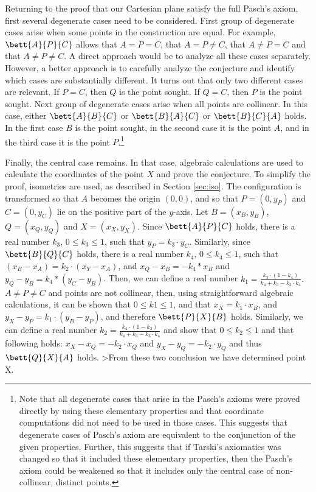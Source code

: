 











Returning to the proof that our Cartesian plane satisfy the full
Pasch's axiom, first several degenerate cases need to be
considered. First group of degenerate cases arise when some points in
the construction are equal. For example, $\bett{A}{P}{C}$ allows that
$A=P=C$, that $A=P\neq C$, that $A\neq P=C$ and that $A \neq P \neq
C$. A direct approach would be to analyze all these cases
separately. However, a better approach is to carefully analyze the
conjecture and identify which cases are substantially different. It
turns out that only two different cases are relevant. If $P=C$, then
$Q$ is the point sought. If $Q=C$, then $P$ is the point sought. Next
group of degenerate cases arise when all points are collinear. In this
case, either $\bett{A}{B}{C}$ or $\bett{B}{A}{C}$ or $\bett{B}{C}{A}$
holds. In the first case $B$ is the point sought, in the second case
it is the point $A$, and in the third case it is the point
$P$.\footnote{ Note that all degenerate cases that arise in the
  Pasch's axioms were proved directly by using these elementary
  properties and that coordinate computations did not need to be used
  in those cases. This suggests that degenerate cases of Pasch's axiom
  are equivalent to the conjunction of the given properties. Further,
  this suggests that if Tarski's axiomatics was changed so that it
  included these elementary properties, then the Pasch's axiom could
  be weakened so that it includes only the central case of
  non-collinear, distinct points.}

Finally, the central case remains. In that case, algebraic
calculations are used to calculate the coordinates of the point $X$
and prove the conjecture. To simplify the proof, isometries are used,
as described in Section \ref{sec:iso}. The configuration is
transformed so that $A$ becomes the origin $(0, 0)$, and so that $P =
(0, y_P)$ and $C = (0, y_C)$ lie on the positive part of the $y$-axis.
Let $B=(x_B, y_B)$, $Q=(x_Q, y_Q)$ and $X = (x_X, y_X)$. Since
$\bett{A}{P}{C}$ holds, there is a real number $k_3$, $0 \le k_3 \le
1$, such that $y_P = k_3\cdot y_C$.  Similarly, since $\bett{B}{Q}{C}$
holds, there is a real number $k_4$, $0 \le k_4 \le 1$, such that
$(x_B - x_A) = k_2 \cdot (x_Y - x_A)$, and $x_Q - x_B = -k_4*x_B$ and
$y_Q - y_B = k_4*(y_C - y_B)$. Then, we can define a real number $k_1
= \frac{k_3\cdot (1 - k_4)}{k_4 + k_3 - k_3\cdot k_4}.$ $A \neq P \neq
C$ and points are not collinear, then, using straightforward algebraic
calculations, it can be shown that $0 \le k1 \le 1$, and that $ x_X =
k_1 \cdot x_B$, and $y_X - y_P = k_1\cdot (y_B - y_P)$, and therefore
$\bett{P}{X}{B}$ holds. Similarly, we can define a real number $k_2 =
\frac{k_4\cdot (1 - k_3)}{k_4 + k_3 - k_3\cdot k_4}$ and show that $0
\le k_2 \le 1$ and that following holds: $x_X - x_Q = -k_2\cdot x_Q$
and $y_X - y_Q = - k_2\cdot y_Q$ and thus $\bett{Q}{X}{A}$ holds.
>From these two conclusion we have determined point X.




